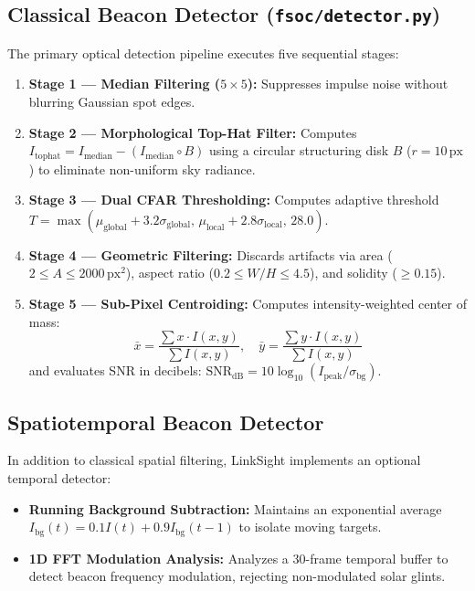 \documentclass[11pt,a4paper]{article}
\begin{document}
\subsection{Classical Beacon Detector (\texttt{fsoc/detector.py})}
The primary optical detection pipeline executes five sequential stages:
\begin{enumerate}[noitemsep,topsep=2pt]
    \item \textbf{Stage 1 — Median Filtering ($5\times 5$):} Suppresses impulse noise without blurring Gaussian spot edges.
    \item \textbf{Stage 2 — Morphological Top-Hat Filter:} Computes $I_{\text{tophat}} = I_{\text{median}} - (I_{\text{median}} \circ B)$ using a circular structuring disk $B$ ($r=10\,\text{px}$) to eliminate non-uniform sky radiance.
    \item \textbf{Stage 3 — Dual CFAR Thresholding:} Computes adaptive threshold $T = \max\left( \mu_{\text{global}} + 3.2\sigma_{\text{global}}, \, \mu_{\text{local}} + 2.8\sigma_{\text{local}}, \, 28.0 \right)$.
    \item \textbf{Stage 4 — Geometric Filtering:} Discards artifacts via area ($2 \le A \le 2000\,\text{px}^2$), aspect ratio ($0.2 \le W/H \le 4.5$), and solidity ($\ge 0.15$).
    \item \textbf{Stage 5 — Sub-Pixel Centroiding:} Computes intensity-weighted center of mass:
    \begin{equation}
        \bar{x} = \frac{\sum x \cdot I(x,y)}{\sum I(x,y)}, \quad \bar{y} = \frac{\sum y \cdot I(x,y)}{\sum I(x,y)}
    \end{equation}
    and evaluates SNR in decibels: $\text{SNR}_{\text{dB}} = 10\log_{10}(I_{\text{peak}} / \sigma_{\text{bg}})$.
\end{enumerate}

\subsection{Spatiotemporal Beacon Detector}
In addition to classical spatial filtering, LinkSight implements an optional temporal detector:
\begin{itemize}[noitemsep,topsep=2pt]
    \item \textbf{Running Background Subtraction:} Maintains an exponential average $I_{\text{bg}}(t) = 0.1 I(t) + 0.9 I_{\text{bg}}(t-1)$ to isolate moving targets.
    \item \textbf{1D FFT Modulation Analysis:} Analyzes a 30-frame temporal buffer to detect beacon frequency modulation, rejecting non-modulated solar glints.
\end{itemize}
\end{document}
